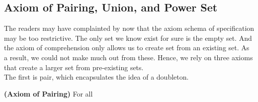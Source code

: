 \subsection{Axiom of Pairing, Union, and Power Set} 
The readers may have complainted by now that the axiom schema of specification may be too restrictive. The only set we know exist for sure is the empty set. And the axiom of comprehension only allows us to create set from an existing set. As a result, we could not make much out from these. Hence, we rely on three axioms that create a larger set from pre-existing sets.\\
The first is pair, which encapsulates the idea of a doubleton.
\begin{ax}
    \textbf{(Axiom of Pairing)} For all 
\end{ax}